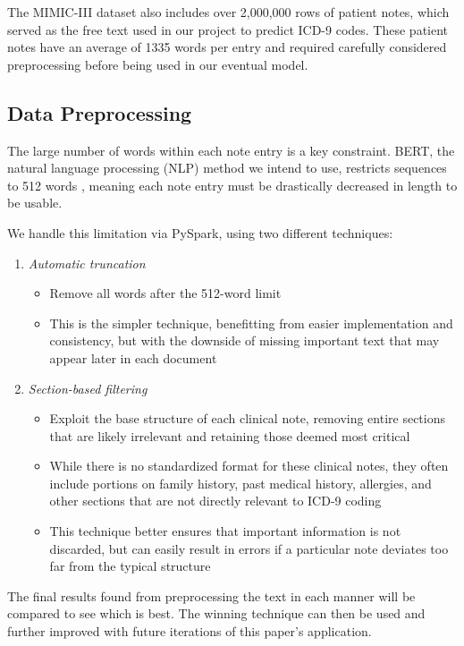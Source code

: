 \documentclass[fleqn,10pt]{olplainarticle}
\begin{document}
The MIMIC-III dataset also includes over 2,000,000 rows of patient notes, which served as the free text used in our project to predict ICD-9 codes. These patient notes have an average of 1335 words per entry and required carefully considered preprocessing before being used in our eventual model.

\subsection{Data Preprocessing}
The large number of words within each note entry is a key constraint. BERT, the natural language processing (NLP) method we intend to use, restricts sequences to 512 words \cite{bertPaper}, meaning each note entry must be drastically decreased in length to be usable. 

We handle this limitation via PySpark, using two different techniques:
\begin{enumerate}[noitemsep] 
\item \textit{Automatic truncation}

\begin{itemize}[noitemsep] 
\item Remove all words after the 512-word limit
\item This is the simpler technique, benefitting from easier implementation and consistency, but with the downside of missing important text that may appear later in each document
\end{itemize}


\item \textit{Section-based filtering}
\begin{itemize}[noitemsep] 
\item Exploit the base structure of each clinical note, removing entire sections that are likely irrelevant and retaining those deemed most critical

\item While there is no standardized format for these clinical notes, they often include portions on family history, past medical history, allergies, and other sections that are not directly relevant to ICD-9 coding

\item This technique better ensures that important information is not discarded, but can easily result in errors if a particular note deviates too far from the typical structure
\end{itemize}
\end{enumerate}
The final results found from preprocessing the text in each manner will be compared to see which is best. The winning technique can then be used and further improved with future iterations of this paper’s application. 
\end{document}
